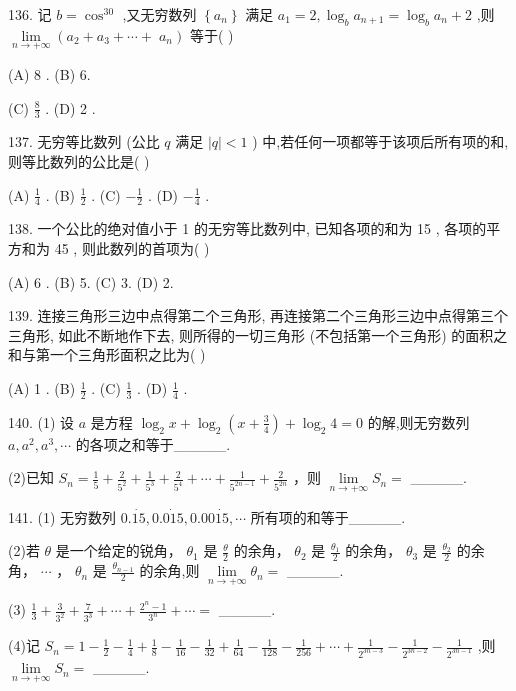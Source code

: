 \documentclass[10pt]{article}
\begin{document}
136. 记 \(b = {\cos }^{30}\) ,又无穷数列 \(\left\{  {a}_{n}\right\}\) 满足 \({a}_{1} = 2,{\log }_{b}{a}_{n + 1} = {\log }_{b}{a}_{n} + 2\) ,则 \(\mathop{\lim }\limits_{{n \rightarrow   + \infty }}\left( {{a}_{2} + {a}_{3} + \cdots  + }\right. \; \left. {a}_{n}\right)\) 等于( )

(A) 8 . (B) 6.

(C) \(\frac{8}{3}\) . (D) 2 .

137. 无穷等比数列 (公比 \(q\) 满足 \(\left| q\right|  < 1\) ) 中,若任何一项都等于该项后所有项的和,则等比数列的公比是( )

(A) \(\frac{1}{4}\) . (B) \(\frac{1}{2}\) . (C) \(- \frac{1}{2}\) . (D) \(- \frac{1}{4}\) .

138. 一个公比的绝对值小于 1 的无穷等比数列中, 已知各项的和为 15 , 各项的平方和为 45 , 则此数列的首项为( )

(A) 6 . (B) 5. (C) 3. (D) 2.

139. 连接三角形三边中点得第二个三角形, 再连接第二个三角形三边中点得第三个三角形, 如此不断地作下去, 则所得的一切三角形 (不包括第一个三角形) 的面积之和与第一个三角形面积之比为( )

(A) 1 . (B) \(\frac{1}{2}\) . (C) \(\frac{1}{3}\) . (D) \(\frac{1}{4}\) .

140. (1) 设 \(a\) 是方程 \({\log }_{2}x + {\log }_{2}\left( {x + \frac{3}{4}}\right)  + {\log }_{2}4 = 0\) 的解,则无穷数列 \(a,{a}^{2},{a}^{3},\cdots\) 的各项之和等于\_\_\_\_\_.

(2)已知 \({S}_{n} = \frac{1}{5} + \frac{2}{{5}^{2}} + \frac{1}{{5}^{3}} + \frac{2}{{5}^{4}} + \cdots  + \frac{1}{{5}^{{2n} - 1}} + \frac{2}{{5}^{2n}}\) ，则 \(\mathop{\lim }\limits_{{n \rightarrow   + \infty }}{S}_{n} =\) \_\_\_\_\_.

141. (1) 无穷数列 \(0.\dot{15},0.\dot{015},{0.00}\dot{15},\cdots\) 所有项的和等于\_\_\_\_\_.

(2)若 \(\theta\) 是一个给定的锐角， \({\theta }_{1}\) 是 \(\frac{\theta }{2}\) 的余角， \({\theta }_{2}\) 是 \(\frac{{\theta }_{1}}{2}\) 的余角， \({\theta }_{3}\) 是 \(\frac{{\theta }_{2}}{2}\) 的余角， \(\cdots\) ， \({\theta }_{n}\) 是 \(\frac{{\theta }_{n - 1}}{2}\) 的余角,则 \(\mathop{\lim }\limits_{{n \rightarrow   + \infty }}{\theta }_{n} =\) \_\_\_\_\_.

(3) \(\frac{1}{3} + \frac{3}{{3}^{2}} + \frac{7}{{3}^{3}} + \cdots  + \frac{{2}^{n} - 1}{{3}^{n}} + \cdots  =\) \_\_\_\_\_.

(4)记 \({S}_{n} = 1 - \frac{1}{2} - \frac{1}{4} + \frac{1}{8} - \frac{1}{16} - \frac{1}{32} + \frac{1}{64} - \frac{1}{128} - \frac{1}{256} + \cdots  + \frac{1}{{2}^{{3n} - 3}} - \frac{1}{{2}^{{3n} - 2}} - \frac{1}{{2}^{{3n} - 1}}\) ,则 \(\mathop{\lim }\limits_{{n \rightarrow   + \infty }}{S}_{n} =\) \_\_\_\_\_.
\end{document}
